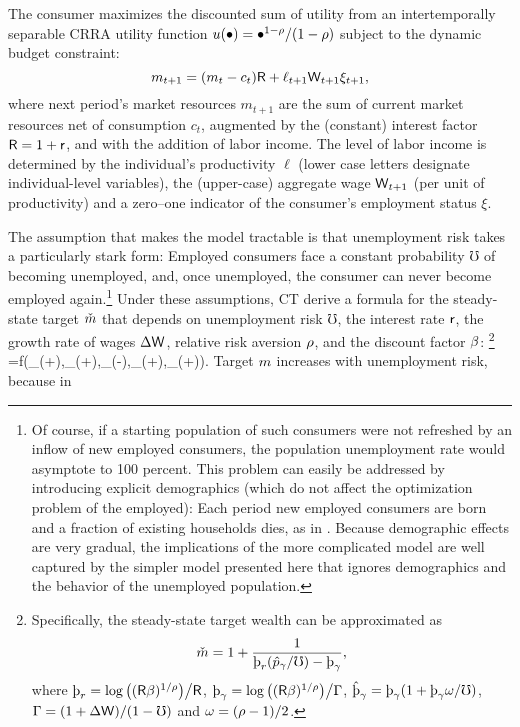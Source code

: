 \documentclass[titlepage]{\econtex}
\begin{document}
The consumer maximizes the discounted sum of utility from an intertemporally separable CRRA utility function $u(\bullet)=\bullet^{1-\rho}/(1-\rho)$ subject to the dynamic budget constraint:
$$
m_{t+1}=(m_t-c_t)\mathsf{R}+\ell_{t+1}\mathsf{W}_{t+1}\xi_{t+1},
$$
where next period's market resources $m_{t+1}$ are the sum of
current market resources net of consumption $c_t$, augmented by the
(constant) interest factor $\mathsf{R}=1+\mathsf{r}$, and with the addition of
labor income. The level of labor income is determined by the
individual's productivity $\ell$ (lower case letters designate
individual-level variables), the (upper-case) aggregate wage $\mathsf{W}_{t+1}$ (per
unit of productivity) and a zero--one indicator of the consumer's
employment status $\xi$.

The assumption that makes the model tractable is that unemployment risk takes a particularly stark form: Employed consumers face a constant probability $\mho$ of becoming unemployed, and, once unemployed, the consumer can never become employed again.\footnote{Of course, if a starting population of such consumers were not refreshed by an inflow of new employed consumers, the population unemployment rate would asymptote to 100 percent.  This problem can easily be addressed by introducing explicit demographics
  (which do not affect the optimization problem of the employed): Each
  period new employed consumers are born and a fraction of existing
  households dies, as in \cite{cjSOE}.  Because
  demographic effects are very gradual, the implications of the more
  complicated model are well captured by the simpler model presented
  here that ignores demographics and the behavior of the unemployed
  population.} Under these assumptions, CT derive a formula for the steady-state target $\check{m}$ that depends on unemployment risk $\mho$, the
interest rate $\mathsf{r}$, the growth rate of wages $\Delta \mathsf{W}$,
relative risk aversion $\rho$, and the discount factor $\beta$:%
\footnote{  Specifically, the steady-state target wealth can be approximated as
$$
\check{\mRat}=1+\frac{1}{\pat_r(\hat{p}_\gamma/\mho)-\pat_\gamma},
$$
where $\pat_r=\log\big((\Rfree\Discount)^{1/\CRRA}\big)\big/\Rfree$,
$\pat_\gamma=\log\big((\Rfree\Discount)^{1/\CRRA}\big)\big/\Gamma$,
$\hat{\pat}_\gamma=\pat_\gamma(1+\pat_\gamma\omega/\mho)$, $\Gamma=(1+\Delta
\mathsf{W})/(1-\mho)$ and $\omega=(\rho-1)/2$.  } \be
\check{\mRat}=f(\mathop{\mho}_{(+)},\mathop{\rfree}_{(+)},\mathop{\Delta
  \Wage}_{(-)},\mathop{\CRRA}_{(+)},\mathop{\Discount}_{(+)}). \label{mTargetNonlin}
\ee Target $m$ increases with unemployment risk, because in
\end{document}
